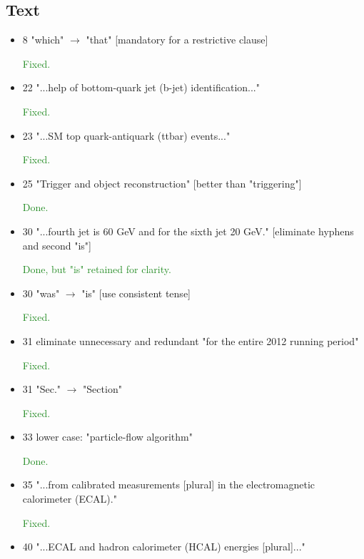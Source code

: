 \documentclass[paper=a4, fontsize=11pt]{scrartcl}
\begin{document}
\subsection{Text}
\begin{itemize}

\item 8 "which" $\rightarrow$  "that" [mandatory for a restrictive clause]

\textcolor{ForestGreen}{Fixed.}

\item 22 "...help of bottom-quark jet (b-jet) identification..."

\textcolor{ForestGreen}{Fixed.}

\item 23 "...SM top quark-antiquark (ttbar) events..."

\textcolor{ForestGreen}{Fixed.}

\item 25 "Trigger and object reconstruction"
 [better than "triggering"]
 
\textcolor{ForestGreen}{Done.}

\item 30 "...fourth jet is 60 GeV and for the sixth jet 20 GeV."
 [eliminate hyphens and second "is"]
 
\textcolor{ForestGreen}{Done, but "is" retained for clarity.}

\item 30 "was" $\rightarrow$  "is" [use consistent tense]

\textcolor{ForestGreen}{Fixed.}

\item 31 eliminate unnecessary and redundant
 "for the entire 2012 running period"
 
\textcolor{ForestGreen}{Fixed.}

\item 31 "Sec." $\rightarrow$  "Section"

\textcolor{ForestGreen}{Fixed.}

\item 33 lower case: "particle-flow algorithm"

\textcolor{ForestGreen}{Done.}

\item 35 "...from calibrated measurements [plural] in the electromagnetic
  calorimeter (ECAL)."
  
\textcolor{ForestGreen}{Fixed.}

\item 40 "...ECAL and hadron calorimeter (HCAL) energies [plural]..."


\end{itemize}
\end{document}
